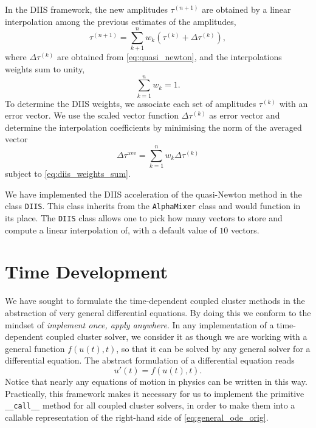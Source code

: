     In the DIIS framework\cite{pulay1980convergence}, the new amplitudes 
    $\tau^{(n+1)}$ are obtained by a linear interpolation among the previous 
    estimates of the amplitudes,
    \begin{equation}
        \tau^{(n+1)} = \sum_{k+1}^n w_k(\tau^{(k)} + \Delta\tau^{(k)}),
    \end{equation}
    where $\Delta\tau^{(k)}$ are obtained from \autoref{eq:quasi_newton}, and 
    the interpolations weights sum to unity,
    \begin{equation*}
        \label{eq:diis_weights_sum}
        \sum_{k=1}^n w_k = 1.
    \end{equation*}
    To determine the DIIS weights, we associate each set of amplitudes $\tau^{(k)}$ 
    with an error vector. We use the scaled vector function $\Delta\tau^{(k)}$ as 
    error vector and determine the interpolation coefficients by minimising the norm of 
    the averaged vector
    \begin{equation}
        \Delta \tau^{\text{ave}} = \sum_{k=1}^n w_k \Delta \tau^{(k)}
    \end{equation}
    subject to \autoref{eq:diis_weights_sum}.

    We have implemented the DIIS acceleration of the quasi-Newton method in the class 
    \lstinline{DIIS}. This class inherits from the \lstinline{AlphaMixer} class and
    would function in its place. The \lstinline{DIIS} class allows one to pick 
    how many vectors to store and compute a linear interpolation of, with a default 
    value of $10$ vectors.

    

    \vfill
    \pagebreak

\section{Time Development}

    We have sought to formulate the time-dependent coupled cluster methods
    in the abstraction of very general differential equations. By doing this we 
    conform to the mindset of \emph{implement once, apply anywhere}. In any 
    implementation of a time-dependent coupled cluster solver, we consider it as
    though we  are working with a general function $f(u(t), t)$, so that it can 
    be solved by any general solver for a differential equation. The abstract 
    formulation of a differential equation reads 
    \begin{equation}
        \label{eq:general_ode_orig}
        u'(t) = f(u(t), t).
    \end{equation}
    Notice that nearly any equations of motion in physics can be written in this 
    way. Practically, this framework makes it necessary for us to implement the  
    primitive \lstinline{__call__} method for all coupled cluster solvers, in order 
    to make them into a callable representation of the right-hand side of 
    \autoref{eq:general_ode_orig}.

